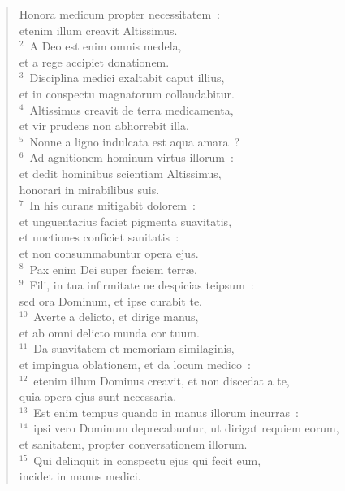 \begin{flushleft}\begin{verse}\vspace{-19pt}\hspace{6pt}Honora medicum propter necessitatem~:\\\hspace{6pt} etenim illum creavit Altissimus.\\
${}^{2}$~A Deo est enim omnis medela,\\ et a rege accipiet donationem.\\
${}^{3}$~Disciplina medici exaltabit caput illius,\\ et in conspectu magnatorum collaudabitur.\\
${}^{4}$~Altissimus creavit de terra medicamenta,\\ et vir prudens non abhorrebit illa.\\
${}^{5}$~Nonne a ligno indulcata est aqua amara~?\\
${}^{6}$~Ad agnitionem hominum virtus illorum~:\\ et dedit hominibus scientiam Altissimus,\\ honorari in mirabilibus suis.\\
${}^{7}$~In his curans mitigabit dolorem~:\\ et unguentarius faciet pigmenta suavitatis,\\ et unctiones conficiet sanitatis~:\\ et non consummabuntur opera ejus.\\
${}^{8}$~Pax enim Dei super faciem terr\ae .\\
${}^{9}$~Fili, in tua infirmitate ne despicias teipsum~:\\ sed ora Dominum, et ipse curabit te.\\
${}^{10}$~Averte a delicto, et dirige manus,\\ et ab omni delicto munda cor tuum.\\
${}^{11}$~Da suavitatem et memoriam similaginis,\\ et impingua oblationem, et da locum medico~:\\
${}^{12}$~etenim illum Dominus creavit, et non discedat a te,\\ quia opera ejus sunt necessaria.\\
${}^{13}$~Est enim tempus quando in manus illorum incurras~:\\
${}^{14}$~ipsi vero Dominum deprecabuntur, ut dirigat requiem eorum,\\ et sanitatem, propter conversationem illorum.\\
${}^{15}$~Qui delinquit in conspectu ejus qui fecit eum,\\ incidet in manus medici.\end{verse}\end{flushleft}


